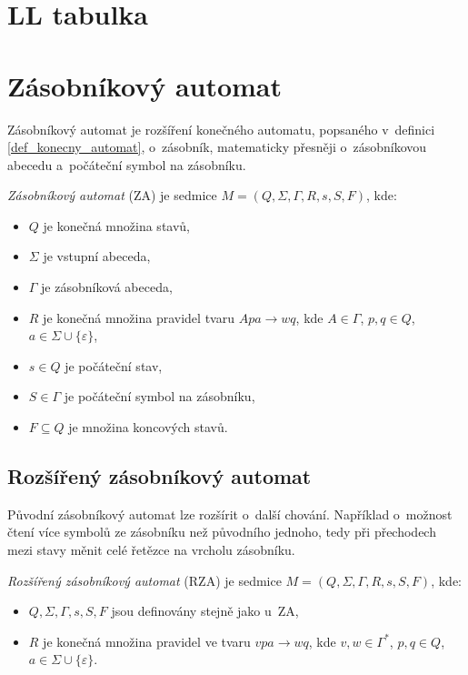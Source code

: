 \section{LL tabulka}

\section{Zásobníkový automat}\label{5_7_zasobnikovy_automat}
Zásobníkový automat je rozšíření konečného automatu, popsaného v~definici \ref{def_konecny_automat}, o~zásobník, matematicky přesněji o~zásobníkovou abecedu a~počáteční symbol na zásobníku.

\begin{definition}\label{def_zasobnikovy_automat}
    \emph{Zásobníkový automat} (ZA) je sedmice $M = (Q, \Sigma, \Gamma, R, s, S, F)$, kde:
    \begin{itemize}
        \item $Q$ je konečná množina stavů,
        \item $\Sigma$ je vstupní abeceda,
        \item $\Gamma$ je zásobníková abeceda,
        \item $R$ je konečná množina pravidel tvaru $Apa \rightarrow wq$, kde $A \in \Gamma$, $p,q \in Q$, $a \in \Sigma \cup \{\varepsilon\}$,  
        \item $s \in Q$ je počáteční stav, 
        \item $S \in \Gamma$ je počáteční symbol na zásobníku,
        \item $F \subseteq Q$ je množina koncových stavů.
    \end{itemize}
\end{definition}

\subsection*{Rozšířený zásobníkový automat}\label{5_7_x_rozsireny_ZA}
Původní zásobníkový automat lze rozšírit o~další chování. Například o~možnost čtení více symbolů ze zásobníku než původního jednoho, tedy při přechodech mezi stavy měnit celé řetězce na vrcholu zásobníku.

\begin{definition}
    \emph{Rozšířený zásobníkový automat} (RZA) je sedmice $M = (Q, \Sigma, \Gamma, R, s, S, F)$, kde:
    \begin{itemize}
        \item $Q, \Sigma, \Gamma, s, S, F$ jsou definovány stejně jako u~ZA,
        \item $R$ je konečná množina pravidel ve tvaru $vpa \rightarrow wq$, kde $v, w \in \Gamma^*$, $p, q \in Q$, $a \in \Sigma \cup \{\varepsilon\}$.
    \end{itemize}
\end{definition}

